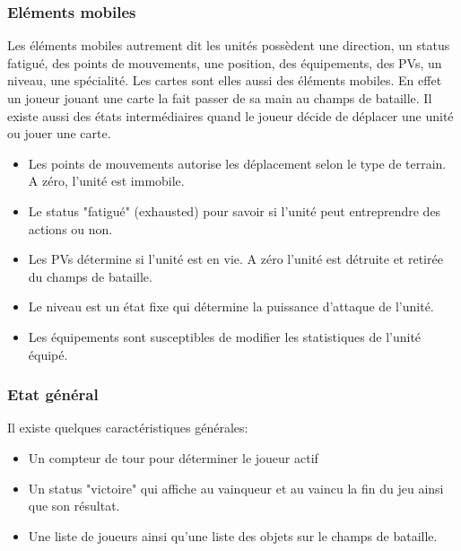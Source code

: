 \newpage


\subsubsection{Eléments mobiles}
Les éléments mobiles autrement dit les unités possèdent une direction, un status fatigué, des points de mouvements, une position, des équipements, des PVs, un niveau, une spécialité. Les cartes sont elles aussi des éléments mobiles. En effet un joueur jouant une carte la fait passer de sa main au champs de bataille. \n
Il existe aussi des états intermédiaires quand le joueur décide de déplacer une unité ou jouer une carte.

\begin{itemize}
    \item Les points de mouvements autorise les déplacement selon le type de terrain. A zéro, l'unité est immobile.
    \item Le status "fatigué" (exhausted) pour savoir si l'unité peut entreprendre des actions ou non.
    \item Les PVs détermine si l'unité est en vie. A zéro l'unité est détruite et retirée du champs de bataille. 
    \item Le niveau est un état fixe qui détermine la puissance d'attaque de l'unité.
    \item Les équipements sont susceptibles de modifier les statistiques de l'unité équipé.
    
\end{itemize}


\subsubsection{Etat général}

Il existe quelques caractéristiques générales:

\begin{itemize}
    \item Un compteur de tour pour déterminer le joueur actif
    \item Un status "victoire" qui affiche au vainqueur et au vaincu la fin du jeu ainsi que son résultat.
    \item Une liste de joueurs ainsi qu'une liste des objets sur le champs de bataille.
\end{itemize}



